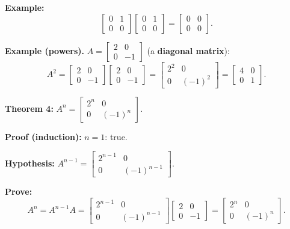 \documentclass{article}
\begin{document}
\bigskip

\textbf{Example:}
\[
\begin{bmatrix} 0 & 1 \\ 0 & 0 \end{bmatrix} \begin{bmatrix} 0 & 1 \\ 0 & 0 \end{bmatrix} = \begin{bmatrix} 0 & 0 \\ 0 & 0 \end{bmatrix}.
\]

\bigskip

\textbf{Example (powers).} $A = \begin{bmatrix} 2 & 0 \\ 0 & -1 \end{bmatrix}$ (a \textbf{diagonal matrix}):
\[
A^2 = \begin{bmatrix} 2 & 0 \\ 0 & -1 \end{bmatrix} \begin{bmatrix} 2 & 0 \\ 0 & -1 \end{bmatrix} = \begin{bmatrix} 2^2 & 0 \\ 0 & (-1)^2 \end{bmatrix} = \begin{bmatrix} 4 & 0 \\ 0 & 1 \end{bmatrix}.
\]

\newpage

\textbf{Theorem 4:} $A^n = \begin{bmatrix} 2^n & 0 \\ 0 & (-1)^n \end{bmatrix}$.

\medskip

\textbf{Proof (induction):} $n = 1$: true.

\medskip

\textbf{Hypothesis:} $A^{n-1} = \begin{bmatrix} 2^{n-1} & 0 \\ 0 & (-1)^{n-1} \end{bmatrix}$.

\medskip

\textbf{Prove:}
\[
A^n = A^{n-1}A = \begin{bmatrix} 2^{n-1} & 0 \\ 0 & (-1)^{n-1} \end{bmatrix} \begin{bmatrix} 2 & 0 \\ 0 & -1 \end{bmatrix} = \begin{bmatrix} 2^n & 0 \\ 0 & (-1)^n \end{bmatrix}.
\]
\end{document}
